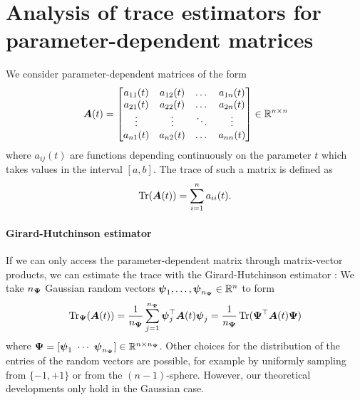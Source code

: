 \documentclass[12pt]{article}
\begin{document}
\section{Analysis of trace estimators for parameter-dependent matrices}
\label{sec:analysis}

We consider parameter-dependent matrices of the form
\begin{equation}
    \boldsymbol{A}(t) = \begin{bmatrix}
        a_{11}(t) & a_{12}(t) & \dots & a_{1n}(t) \\
        a_{21}(t) & a_{22}(t) & \dots & a_{2n}(t) \\
        \vdots & \vdots & \ddots & \vdots \\
        a_{n1}(t) & a_{n2}(t) & \dots & a_{nn}(t) \\
    \end{bmatrix} \in \mathbb{R}^{n \times n}
\end{equation}
where $a_{ij}(t)$ are functions depending continuously on the parameter $t$ which takes values in the interval $[a,b]$. The trace of such a matrix is defined as
\begin{equation}
    \operatorname{Tr}(\boldsymbol{A}(t)) = \sum_{i=1}^{n} a_{ii}(t).
\end{equation}

\paragraph{Girard-Hutchinson estimator} If we can only access the parameter-dependent matrix through matrix-vector products, we can estimate the trace with the Girard-Hutchinson estimator \cite{girard-1989-fast-montecarlo,hutchinson-1990-stochastic-estimator}: We take $n_{\boldsymbol{\Psi}}$ Gaussian random vectors $\boldsymbol{\psi}_1,\dots, \boldsymbol{\psi}_{n_{\boldsymbol{\Psi}}} \in \mathbb{R}^{n}$ to form
\begin{equation}
    \operatorname{Tr}_{\boldsymbol{\Psi}}(\boldsymbol{A}(t))
    = \frac{1}{n_{\boldsymbol{\Psi}}} \sum_{j=1}^{n_{\boldsymbol{\Psi}}} \boldsymbol{\psi}_j^{\top} \boldsymbol{A}(t) \boldsymbol{\psi}_j
    = \frac{1}{n_{\boldsymbol{\Psi}}} \operatorname{Tr}( \boldsymbol{\Psi}^{\top} \boldsymbol{A}(t) \boldsymbol{\Psi})
    \label{equ:hutchinson-trace-estimator}
\end{equation}
where $\boldsymbol{\Psi} = [\boldsymbol{\psi}_1 ~ \cdots ~ \boldsymbol{\psi}_{n_{\boldsymbol{\Psi}}}] \in \mathbb{R}^{n \times n_{\boldsymbol{\Psi}}}$. Other choices for the distribution of the entries of the random vectors are possible, for example by uniformly sampling from $\{-1, +1\}$ or from the $(n-1)$-sphere. However, our theoretical developments only hold in the Gaussian case.
\end{document}
